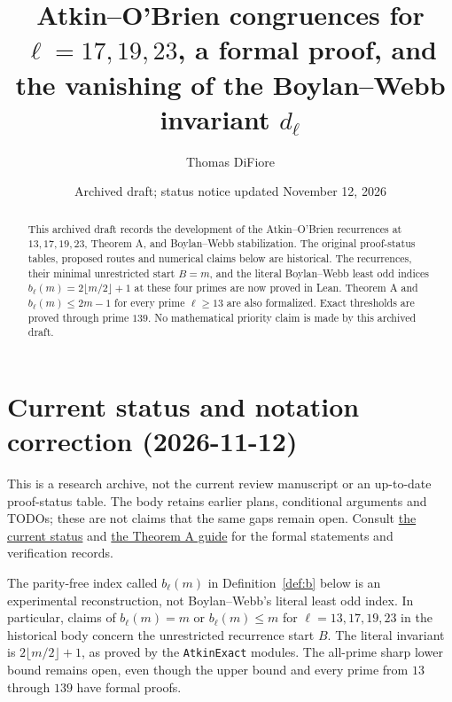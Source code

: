 \documentclass[11pt]{amsart}
\theoremstyle{plain}
\theoremstyle{definition}
\numberwithin{equation}{section}
\begin{document}
\title[Atkin--O'Brien congruences and the vanishing of $d_\ell$]{Atkin--O'Brien congruences for $\ell=17,19,23$, a formal proof, and the vanishing of the Boylan--Webb invariant $d_\ell$}

\author{Thomas DiFiore}

\date{Archived draft; status notice updated November 12, 2026}

\begin{abstract}
This archived draft records the development of the Atkin--O'Brien
recurrences at $13,17,19,23$, Theorem A, and Boylan--Webb stabilization.
The original proof-status tables, proposed routes and numerical claims
below are historical. The recurrences, their minimal unrestricted start
$B=m$, and the literal Boylan--Webb least odd indices
$b_\ell(m)=2\lfloor m/2\rfloor+1$ at these four primes are now proved in Lean.
Theorem A and $b_\ell(m)\le2m-1$ for every prime $\ell\ge13$ are also
formalized. Exact thresholds are proved through prime $139$.
No mathematical priority claim is made by this archived draft.
\end{abstract}

\maketitle
\section*{Current status and notation correction (2026-11-12)}
This is a research archive, not the current review manuscript or an
up-to-date proof-status table. The body retains earlier plans, conditional
arguments and TODOs; these are not claims that the same gaps remain open.
Consult \href{https://github.com/tomdif/RamanujanLean/blob/main/docs/STATUS.md}{the current status}
and \href{https://github.com/tomdif/RamanujanLean/blob/main/docs/THEOREM_A.md}{the Theorem A guide}
for the formal statements and verification records.

The parity-free index called $b_\ell(m)$ in Definition~\ref{def:b} below
is an experimental reconstruction, not Boylan--Webb's literal least odd
index. In particular, claims of $b_\ell(m)=m$ or $b_\ell(m)\le m$ for
$\ell=13,17,19,23$ in the historical body concern the unrestricted
recurrence start $B$. The literal invariant is
$2\lfloor m/2\rfloor+1$, as proved by the \texttt{AtkinExact} modules.
The all-prime sharp lower bound remains open, even though the upper bound
and every prime from $13$ through $139$ have formal proofs.
\end{document}
